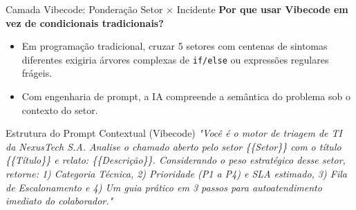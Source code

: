 \documentclass[aspectratio=169, 10pt]{beamer}
\begin{document}
\begin{frame}{Camada Vibecode: Ponderação Setor $\times$ Incidente}
    \textbf{Por que usar Vibecode em vez de condicionais tradicionais?}
    \begin{itemize}
        \item Em programação tradicional, cruzar 5 setores com centenas de sintomas diferentes exigiria árvores complexas de \texttt{if/else} ou expressões regulares frágeis.
        \item Com engenharia de prompt, a IA compreende a semântica do problema sob o contexto do setor.
    \end{itemize}

    \vspace{0.2cm}
    \begin{exampleblock}{Estrutura do Prompt Contextual (Vibecode)}
        \textit{"Você é o motor de triagem de TI da NexusTech S.A. Analise o chamado aberto pelo setor \{\{Setor\}\} com o título \{\{Título\}\} e relato: \{\{Descrição\}\}. Considerando o peso estratégico desse setor, retorne: 1) Categoria Técnica, 2) Prioridade (P1 a P4) e SLA estimado, 3) Fila de Escalonamento e 4) Um guia prático em 3 passos para autoatendimento imediato do colaborador."}
    \end{exampleblock}
\end{frame}
\end{document}
